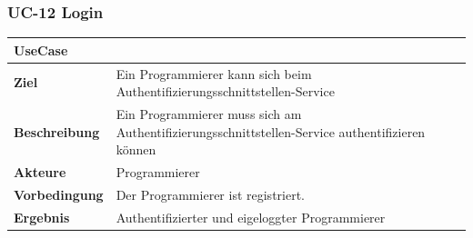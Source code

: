 \subsubsection{UC-12 Login}\label{uc-12-login}

\begin{longtable}[c]{@{}ll@{}}
\toprule
\begin{minipage}[b]{0.34\columnwidth}\raggedright\strut
\textbf{UseCase}
\strut\end{minipage} &
\begin{minipage}[b]{0.60\columnwidth}\raggedright\strut
\strut\end{minipage}\tabularnewline
\midrule
\endhead
\begin{minipage}[t]{0.34\columnwidth}\raggedright\strut
\textbf{Ziel}
\strut\end{minipage} &
\begin{minipage}[t]{0.60\columnwidth}\raggedright\strut
Ein Programmierer kann sich beim
Authentifizierungsschnittstellen-Service
\strut\end{minipage}\tabularnewline
\begin{minipage}[t]{0.34\columnwidth}\raggedright\strut
\textbf{Beschreibung}
\strut\end{minipage} &
\begin{minipage}[t]{0.60\columnwidth}\raggedright\strut
Ein Programmierer muss sich am Authentifizierungsschnittstellen-Service
authentifizieren können
\strut\end{minipage}\tabularnewline
\begin{minipage}[t]{0.34\columnwidth}\raggedright\strut
\textbf{Akteure}
\strut\end{minipage} &
\begin{minipage}[t]{0.60\columnwidth}\raggedright\strut
Programmierer
\strut\end{minipage}\tabularnewline
\begin{minipage}[t]{0.34\columnwidth}\raggedright\strut
\textbf{Vorbedingung}
\strut\end{minipage} &
\begin{minipage}[t]{0.60\columnwidth}\raggedright\strut
Der Programmierer ist registriert.
\strut\end{minipage}\tabularnewline
\begin{minipage}[t]{0.34\columnwidth}\raggedright\strut
\textbf{Ergebnis}
\strut\end{minipage} &
\begin{minipage}[t]{0.60\columnwidth}\raggedright\strut
Authentifizierter und eigeloggter Programmierer

\end{minipage}
\end{longtable}
